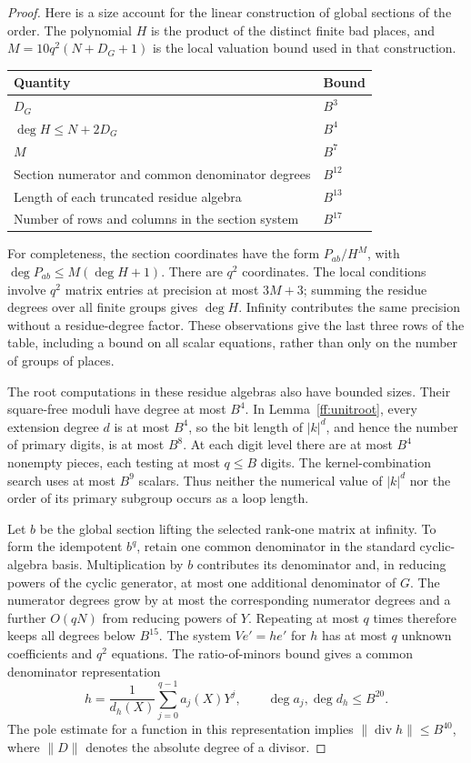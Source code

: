 \begin{proof}
Here is a size account for the linear construction of global sections of
the order.  The polynomial $H$ is the product of the distinct finite bad
places, and $M=10q^2(N+D_G+1)$ is the local valuation bound used in that
construction.
\begin{center}
\begin{tabular}{ll}
\hline
Quantity & Bound \\
\hline
$D_G$ & $B^3$ \\
$\deg H\le N+2D_G$ & $B^4$ \\
$M$ & $B^7$ \\
Section numerator and common denominator degrees & $B^{12}$ \\
Length of each truncated residue algebra & $B^{13}$ \\
Number of rows and columns in the section system & $B^{17}$ \\
\hline
\end{tabular}
\end{center}
For completeness, the section coordinates have the form
$P_{ab}/H^M$, with $\deg P_{ab}\le M(\deg H+1)$.
There are $q^2$ coordinates.  The local conditions involve $q^2$ matrix
entries at precision at most $3M+3$; summing the residue degrees over all
finite groups gives $\deg H$.  Infinity contributes the same precision
without a residue-degree factor.  These observations give the last three
rows of the table, including a bound on all scalar equations, rather than
only on the number of groups of places.

The root computations in these residue algebras also have bounded sizes.
Their square-free moduli have degree at most $B^4$.  In
Lemma~\ref{ff:unitroot}, every extension degree $d$ is at most $B^4$, so
the bit length of $|k|^d$, and hence the number of primary digits, is at
most $B^8$.  At each digit level there are at most $B^4$ nonempty pieces,
each testing at most $q\le B$ digits.  The kernel-combination search uses
at most $B^9$ scalars.  Thus neither the numerical value of $|k|^d$ nor
the order of its primary subgroup occurs as a loop length.

Let $b$ be the global section lifting the selected rank-one matrix at
infinity.  To form the idempotent $b^q$, retain one common denominator in
the standard cyclic-algebra basis.  Multiplication by $b$ contributes its
denominator and, in reducing powers of the cyclic generator, at most one
additional denominator of $G$.  The numerator degrees grow by at most the
corresponding numerator degrees and a further $O(qN)$ from reducing
powers of $Y$.  Repeating at most $q$ times therefore keeps all degrees
below $B^{15}$.  The system $Ve'=he'$ for $h$ has at most $q$ unknown
coefficients and $q^2$ equations.  The ratio-of-minors bound gives a common
denominator representation
\[
 h=\frac{1}{d_h(X)}\sum_{j=0}^{q-1}a_j(X)Y^j,
 \qquad \deg a_j,\deg d_h\le B^{20}.
\]
The pole estimate for a function in this representation implies
$\|\operatorname{div}h\|\le B^{40}$, where
$\|D\|$ denotes the absolute degree of a divisor.


\end{proof}
